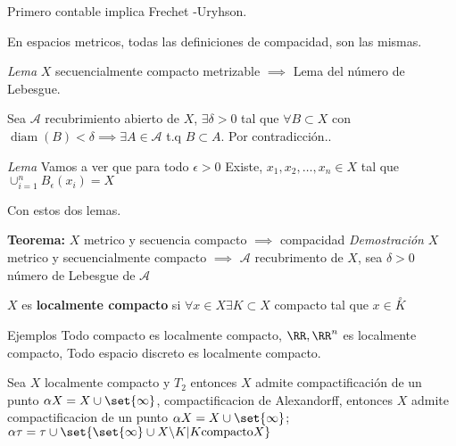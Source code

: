 Primero contable implica Frechet -Uryhson.

En espacios metricos, todas las definiciones de compacidad, son las mismas. 

\textit{Lema} $ X $ secuencialmente compacto metrizable $ \implies $ Lema del número de Lebesgue.

Sea $ \mathcal{A} $ recubrimiento abierto de $ X $, $ \exists \delta > 0 $ tal que $  \forall B \subset X $ con $ \operatorname{diam}(B) < \delta \implies \exists A \in \mathcal{A} $ t.q $ B \subset A $. Por contradicción..

\textit{Lema} Vamos a ver que para todo $  \epsilon > 0 $ Existe, $ x_1, x_2, \ldots, x_n \in X $ tal que $ \cup_{i = 1}^n B_\epsilon(x_i) = X $

Con estos dos lemas.

\textbf{Teorema:} $ X $ metrico y secuencia compacto $ \implies $ compacidad
\textit{Demostración}
 $ X $ metrico y secuencialmente compacto $ \implies $ $ \mathcal{A} $ recubrimento de $ X $, sea  $  \delta > 0 $ número de Lebesgue de $ \mathcal{A} $
 
 \begin{define}
 	$ X $ es \textbf{localmente compacto} si $ \forall x \in X \exists K \subset X $ compacto tal que $ x \in \overset{\circ}{K} $
 \end{define}
 
 Ejemplos Todo compacto es localmente compacto, $ \RR, \RR^n $ es localmente compacto, Todo espacio discreto es localmente compacto.
 
Sea $ X $ localmente compacto y $ T_2 $ entonces $ X $ admite compactificación de un punto $ \alpha X = X \cup \set{\infty} $, compactificacion de Alexandorff, entonces $ X $ admite compactificacion de un punto $ \alpha X = X \cup \set{\infty} $; $ \alpha \tau = \tau \cup \set{\set{\infty} \cup X \backslash K | K \textrm{compacto} X} $

\begin{itemize}
	\item $ X \overset{\textrm{avierto}{\subset} Y $
		\item $ Y $ es compacto de Hausdorff
		\item $ \abs{Y \backslash X} = 1 $
\end{itemize}